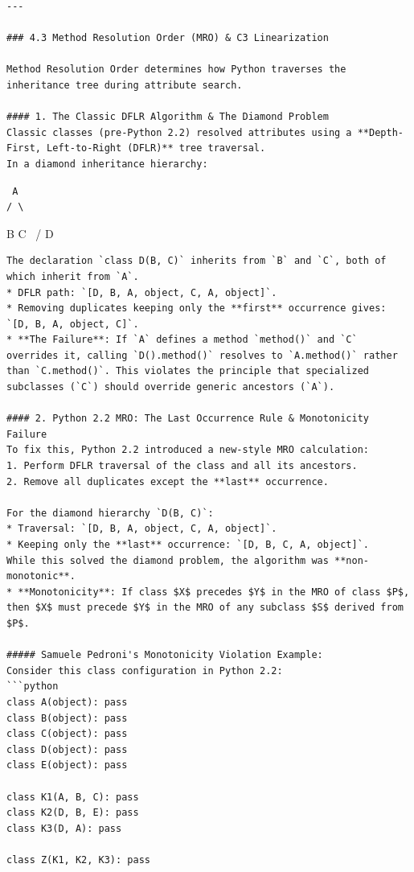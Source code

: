 \begin{lstlisting}
---

### 4.3 Method Resolution Order (MRO) & C3 Linearization

Method Resolution Order determines how Python traverses the inheritance tree during attribute search.

#### 1. The Classic DFLR Algorithm & The Diamond Problem
Classic classes (pre-Python 2.2) resolved attributes using a **Depth-First, Left-to-Right (DFLR)** tree traversal.
In a diamond inheritance hierarchy:
\end{lstlisting}

\begin{lstlisting}
 A
/ \
\end{lstlisting}

B C ~/ D

\begin{lstlisting}
The declaration `class D(B, C)` inherits from `B` and `C`, both of which inherit from `A`. 
* DFLR path: `[D, B, A, object, C, A, object]`.
* Removing duplicates keeping only the **first** occurrence gives: `[D, B, A, object, C]`.
* **The Failure**: If `A` defines a method `method()` and `C` overrides it, calling `D().method()` resolves to `A.method()` rather than `C.method()`. This violates the principle that specialized subclasses (`C`) should override generic ancestors (`A`).

#### 2. Python 2.2 MRO: The Last Occurrence Rule & Monotonicity Failure
To fix this, Python 2.2 introduced a new-style MRO calculation:
1. Perform DFLR traversal of the class and all its ancestors.
2. Remove all duplicates except the **last** occurrence.

For the diamond hierarchy `D(B, C)`:
* Traversal: `[D, B, A, object, C, A, object]`.
* Keeping only the **last** occurrence: `[D, B, C, A, object]`.
While this solved the diamond problem, the algorithm was **non-monotonic**.
* **Monotonicity**: If class $X$ precedes $Y$ in the MRO of class $P$, then $X$ must precede $Y$ in the MRO of any subclass $S$ derived from $P$.

##### Samuele Pedroni's Monotonicity Violation Example:
Consider this class configuration in Python 2.2:
```python
class A(object): pass
class B(object): pass
class C(object): pass
class D(object): pass
class E(object): pass

class K1(A, B, C): pass
class K2(D, B, E): pass
class K3(D, A): pass

class Z(K1, K2, K3): pass
\end{lstlisting}

